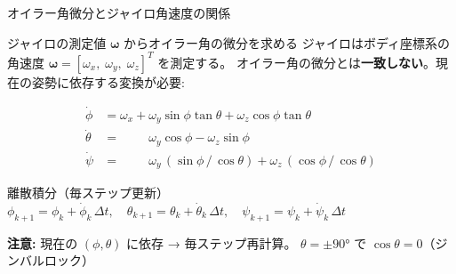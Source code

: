 \begin{frame}{オイラー角微分とジャイロ角速度の関係}

  \begin{block}{ジャイロの測定値 $\boldsymbol{\omega}$ からオイラー角の微分を求める}
    {\small
    ジャイロはボディ座標系の角速度 $\boldsymbol{\omega} = [\omega_x,\;\omega_y,\;\omega_z]^T$ を測定する。
    オイラー角の微分とは\textbf{一致しない}。現在の姿勢に依存する変換が必要:
    }
  \end{block}

  \vspace{-1.0em}
  {\small
  \begin{align*}
    \dot{\phi}   &= \omega_x
                  + \omega_y \sin\phi\tan\theta
                  + \omega_z \cos\phi\tan\theta \\
    \dot{\theta} &= \phantom{\omega_x +{}}
                    \omega_y \cos\phi
                  - \omega_z \sin\phi \\
    \dot{\psi}   &= \phantom{\omega_x +{}}
                    \omega_y \,(\sin\phi\,/\,\cos\theta)
                  + \omega_z \,(\cos\phi\,/\,\cos\theta)
  \end{align*}
  }

  \vspace{-0.8em}

  \begin{exampleblock}{離散積分（毎ステップ更新）}
    {\small
    $\phi_{k+1} = \phi_k + \dot{\phi}_k\,\Delta t,\quad
    \theta_{k+1} = \theta_k + \dot{\theta}_k\,\Delta t,\quad
    \psi_{k+1} = \psi_k + \dot{\psi}_k\,\Delta t$
    }
  \end{exampleblock}

  \vspace{-0.2em}

  {\footnotesize
    \textbf{注意:}
    現在の $(\phi,\theta)$ に依存 → 毎ステップ再計算。
    $\theta{=}\pm 90°$ で $\cos\theta{=}0$（ジンバルロック）
  }
\end{frame}

